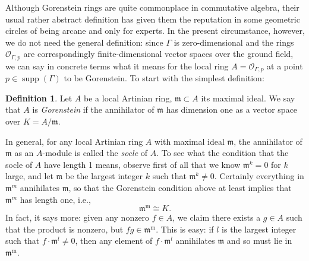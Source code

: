 \documentclass{bull-l}
\newcommand{\MM}{\operatorname{m}}
\newcommand{\supp}{\operatorname{supp}}
\theoremstyle{pplain}
\theoremstyle{definition}
\newtheorem*{dfn}{Definition}
\begin{document}
Although Gorenstein rings are quite commonplace in commutative algebra, their
usual rather abstract definition has given them the reputation in some
geometric circles of being arcane and only for experts.  In the present
circumstance, however, we do not need the general definition: since $\Gamma$ is
zero-dimensional and the rings $\mathcal{O}_{\Gamma,p}$ 
are correspondingly finite-dimensional vector spaces over the ground field, 
we can say in concrete terms what it means for the local 
ring $A=\mathcal{O}_{\Gamma,p}$ at a point 
$p\in \supp(\Gamma)$ to be Gorenstein.  To start with the
simplest definition:

\begin{dfn} 
Let $A$ be a local Artinian ring, $\mathfrak{m}\subset A$ its maximal ideal.  We
say that $A$ is \emph{Gorenstein} if the annihilator of $\mathfrak{m}$ has 
dimension one as a vector space over $K=A/\mathfrak{m}$.
\end{dfn}


In general, for any local Artinian ring $A$ with maximal ideal $\mathfrak{m}$, 
the annihilator of $\mathfrak{m}$ as an $A$-module is called the \emph{socle}
of $A$.  To see what the condition that the socle of $A$ have length 1 means,
observe first of all that we know $\mathfrak{m}^k=0$ for $k$ large, and let $
\mathfrak{m}$ be the largest integer $k$ such that $\mathfrak{m} ^k\ne 0$. 
Certainly everything in $\mathfrak{m}^m$ annihilates $\mathfrak{m}$, so that
the Gorenstein condition above at least implies that $\mathfrak{m}^m$ has
length one, i.e.,
\begin{equation}\label{eq:ast}
\mathfrak{m}^{\MM}\cong K. \tag {$*$}
\end{equation}
In fact, it says more: given any nonzero $f\in A$, we claim there exists a
$g\in A$ such that the product is nonzero, but $fg\in \mathfrak{m}^{\MM}$.  
This is easy: if $l$ is the largest integer such that $f\cdot \mathfrak{m}^l\ne
0$, then any element of $f\cdot \mathfrak{m}^l$ annihilates $\mathfrak{m}$ and
so must lie in $\mathfrak{m}^{\MM}$.  
\end{document}
